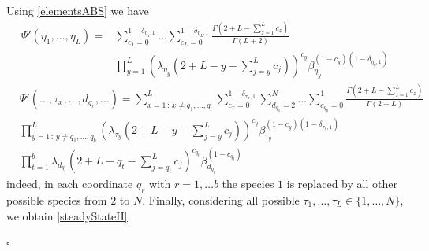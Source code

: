 \documentclass[10pt]{article}
\numberwithin{equation}{section}
\numberwithin{equation}{subsection}
\begin{document}
		Using \eqref{elementsABS} we have 
		\begin{equation}
			\begin{split}
				\Psi{'}(\eta_{1},\ldots,\eta_{L})=&\sum_{c_{1}=0}^{1-\delta_{\eta_{1},1}}\ldots\sum_{c_{L}=0}^{1-\delta_{\eta_{L},1}}\frac{\Gamma(2+L-\sum_{z=1}^{L}c_{z})}{\Gamma(L+2)}
				\\&
				\prod_{y=1}^{L}\left(\lambda_{\eta_{y}}\left(2+L-y-\sum_{j=y}^{L}c_{j}\right)\right)^{c_{y}}\beta_{\eta_{y}}^{(1-c_{y})(1-\delta_{\eta_{y},1})}
			\end{split}
		\end{equation}
		{\color{blue}
			\begin{equation}
				\begin{split}
					&\Psi{'}(\ldots,\tau_{x},\ldots,d_{q_{r}},\ldots)=\sum_{x=1\,:\, x\neq q_{1},\ldots,q_{l}}^{L}\sum_{c_{x}=0}^{1-\delta_{\tau_{x},1}}\sum_{d_{q_{1}}=2}^{N}\ldots\sum_{c_{q_{p}}=0}^{1}\frac{\Gamma(2+L-\sum_{z=1}^{L}c_{z})}{\Gamma(2+L)}
					\\&  
					\prod_{y=1\,:\, y\neq q_{1},\ldots,q_{b}}^{L}\left(\lambda_{\tau_{y}}\left(2+L-y-\sum_{j=y}^{L}c_{j}\right)\right)^{c_{y}}\beta_{\tau_{y}}^{(1-c_{y})(1-\delta_{\tau_{y},1})}
					\\&
					\prod_{t=1}^{b}\lambda_{d_{q_{t}}}\left(2+L-q_{t}-\sum_{j=q_{t}}^{L}c_{j}\right)^{c_{q_{t}}}\beta_{d_{q_{t}}}^{(1-c_{q_{t}})}
				\end{split}
		\end{equation}} indeed, in each coordinate $q_{r}$ with $r=1,\ldots b$ the species $1$ is replaced by all other possible species from $2$ to $N$.  Finally, considering all possible $\tau_{1},\ldots,\tau_{L}\in \{1,\ldots,N\}$, we obtain \eqref{steadyStateH}. 
		\begin{flushright}
			$\square$
		\end{flushright}
\end{document}

